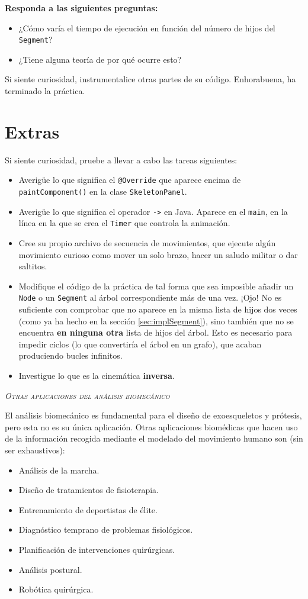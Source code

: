 \documentclass[10pt,a4paper,spanish]{article}
\newcommand{\sombreado}[2]{
  \begin{shaded}
    \begin{center} \emph{\textsc{#1}} \end{center}
    \noindent #2\\
  \end{shaded}
}
\newcommand{\code}[1]{\texttt{#1}}
\begin{document}
\textbf{Responda a las siguientes preguntas:}

\begin{itemize}
    \item ¿Cómo varía el tiempo de ejecución en función del número de hijos del \code{Segment}?
    \item ¿Tiene alguna teoría de por qué ocurre esto?
\end{itemize}

Si siente curiosidad, instrumentalice otras partes de su código. Enhorabuena, ha terminado la práctica.

\section{Extras}

Si siente curiosidad, pruebe a llevar a cabo las tareas siguientes:

\begin{itemize}
    \item Averigüe lo que significa el \code{@Override} que aparece encima de \code{paintComponent()} en la clase \code{SkeletonPanel}.
    \item Averigüe lo que significa el operador \code{->} en Java. Aparece en el \code{main}, en la línea en la que se crea el \code{Timer} que controla la animación.
    \item Cree su propio archivo de secuencia de movimientos, que ejecute algún movimiento curioso como mover un solo brazo, hacer un saludo militar o dar saltitos.
    \item Modifique el código de la práctica de tal forma que sea imposible añadir un \code{Node} o un \code{Segment} al árbol correspondiente más de una vez. ¡Ojo! No es suficiente con comprobar que no aparece en la misma lista de hijos dos veces (como ya ha hecho en la sección \ref{sec:implSegment}), sino también que no se encuentra \textbf{en ninguna otra} lista de hijos del árbol. Esto es necesario para impedir ciclos (lo que convertiría el árbol en un grafo), que acaban produciendo bucles infinitos.
    \item Investigue lo que es la cinemática \textbf{inversa}.
\end{itemize}

\sombreado{Otras aplicaciones del análisis biomecánico}{El análisis biomecánico es fundamental para el diseño de exoesqueletos y prótesis, pero esta no es su única aplicación. Otras aplicaciones biomédicas que hacen uso de la información recogida mediante el modelado del movimiento humano son (sin ser exhaustivos):

\begin{itemize}
    \item Análisis de la marcha.
    \item Diseño de tratamientos de fisioterapia.
    \item Entrenamiento de deportistas de élite.
    \item Diagnóstico temprano de problemas fisiológicos.
    \item Planificación de intervenciones quirúrgicas.
    \item Análisis postural.
    \item Robótica quirúrgica.
\end{itemize}\strut}
\end{document}

